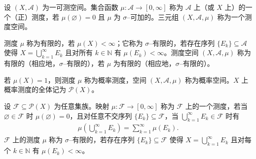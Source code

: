 \documentclass[../../main.tex]{subfiles}%
\begin{document}
\begin{definition}\label{definition:ch01-测度}
设 $(X,\mathcal{A})$ 为一可测空间。集合函数 $\mu:\mathcal{A}\to[0,\infty]$ 称为 $\mathcal{A}$ 上（或 $X$ 上）的一个（正）测度，若 $\mu(\varnothing )=0$ 且 $\mu$ 为 $\sigma$--可加的。三元组 $(X,\mathcal{A},\mu)$ 称为一个测度空间。

测度 $\mu$ 称为有限的，若 $\mu(X)<\infty$；它称为 $\sigma$--有限的，若存在序列 $\{E_k\}\subseteq\mathcal{A}$ 使得 $X=\bigcup_{k=1}^\infty E_k$ 且对所有 $k\in\mathbb{N}$ 有 $\mu(E_k)<\infty$。测度空间 $(X,\mathcal{A},\mu)$ 称为有限的（相应地，$\sigma$--有限的），若 $\mu$ 为有限的（相应地，$\sigma$--有限的）。

若 $\mu(X)=1$，则测度 $\mu$ 称为概率测度，空间 $(X,\mathcal{A},\mu)$ 称为概率空间。$X$ 上概率测度的全体记为 $\mathcal{P}(X)$。

设 $\mathcal{F}\subseteq\mathcal{P}(X)$ 为任意集族。映射 $\mu:\mathcal{F}\to[0,\infty]$ 称为 $\mathcal{F}$ 上的一个测度，若当 $\varnothing \in\mathcal{F}$ 时 $\mu(\varnothing )=0$，且对任意不交序列 $\{E_k\}\subseteq\mathcal{F}$，当 $\bigcup_{k=1}^\infty E_k\in\mathcal{F}$ 时有
\begin{align*}
\mu\left(\bigcup_{k=1}^\infty E_k\right)=\sum_{k=1}^\infty\mu(E_k).
\end{align*}
$\mathcal{F}$ 上的测度 $\mu$ 称为 $\sigma$--有限的，若存在序列 $\{E_k\}\subseteq\mathcal{F}$ 使得 $X=\bigcup_{k=1}^\infty E_k$ 且对每个 $k\in\mathbb{N}$ 有 $\mu(E_k)<\infty$。
\end{definition}
\end{document}
